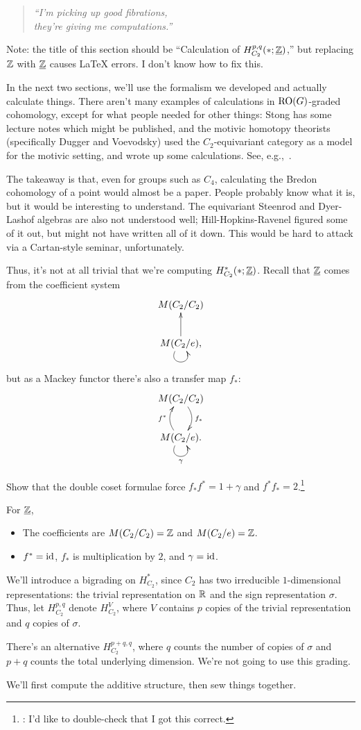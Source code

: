 \begin{quote}\textit{
	``I'm picking up good fibrations,\\
	they're giving me computations.''
}\end{quote}
{\small
\begin{rem}
	Note: the title of this section should be ``Calculation of $H_{C_2}^{p,q}(*; \underline{\mathbb Z})$,'' but replacing
	$\mathbb Z$ with $\underline{\mathbb Z}$ causes \LaTeX{} errors. I don't know how to fix this.
\end{rem}
}

In the next two sections, we'll use the formalism we developed and actually calculate things.  There aren't many
examples of calculations in $\mathrm{RO}(G)$-graded cohomology, except for what people needed for other things: Stong has
some lecture notes which might be published, and the motivic homotopy theorists (specifically Dugger and Voevodsky)
used the $C_2$-equivariant category as a model for the motivic setting, and wrote up some calculations.  See,
e.g.,~\cite{Lew88, Dug15}.

The takeaway is that, even for groups such as $C_4$, calculating the Bredon cohomology of a point would almost be a
paper. People probably know what it is, but it would be interesting to understand. The equivariant Steenrod and
Dyer-Lashof algebras are also not understood well; Hill-Hopkins-Ravenel figured some of it out, but might not have
written all of it down. This would be hard to attack via a Cartan-style seminar, unfortunately.

Thus, it's not at all trivial that we're computing $H_{C_2}^*(*;\underline{\mathbb Z})$. Recall that $\underline{\mathbb Z}$ comes
from the coefficient system
\[\xymatrix{
	M(C_2/C_2)\\
	M(C_2/e),\ar[u]\ar@(dl,dr)_{}
}\]
but as a Mackey functor there's also a transfer map $f_*$:
\[\xymatrix{
	M(C_2/C_2)\ar@/^0.4cm/[d]^{f_*}\\
	M(C_2/e).\ar@/^0.4cm/[u]^{f^*}\ar@(dl,dr)_\gamma
}\]
\begin{ex}
Show that the double coset formulae force $f_*f^* = 1+\gamma$ and $f^*f_* = 2$.\footnote{\TODO: I'd like to
double-check that I got this correct.}
\end{ex}
For $\underline{\mathbb Z}$,
\begin{itemize}
	\item The coefficients are $M(C_2/C_2) = \mathbb Z$ and $M(C_2/e) = \mathbb Z$.
	\item $f^* = \mathrm{id}$, $f_*$ is multiplication by $2$, and $\gamma = \mathrm{id}$.
\end{itemize}
We'll introduce a bigrading on $H^*_{C_2}$, since $C_2$ has two irreducible $1$-dimensional representations: the
trivial representation on $\mathbb R$ and the sign representation $\sigma$. Thus, let $H_{C_2}^{p,q}$ denote $H_{C_2}^V$,
where $V$ contains $p$ copies of the trivial representation and $q$ copies of $\sigma$.
\begin{rem}
There's an alternative  $H_{C_2}^{p+q,q}$, where $q$ counts the number of copies of $\sigma$
and $p+q$ counts the total underlying dimension. We're not going to use this grading.
\end{rem}
We'll first compute the additive structure, then sew things together.

